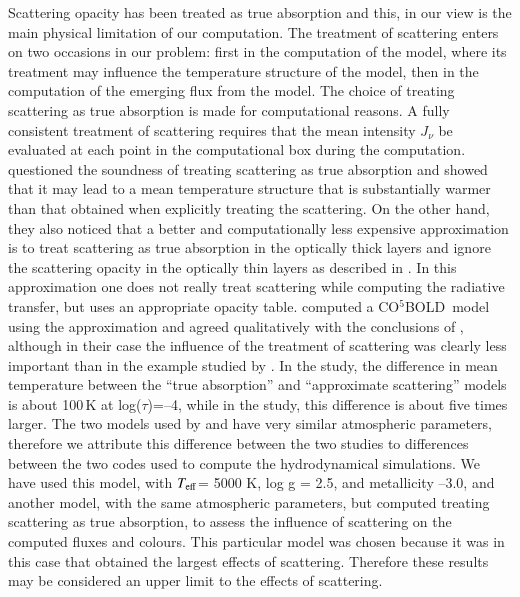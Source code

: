 \documentclass[]{aa}
\def\teff{$T\rm_{eff}$}
\newcommand{\cobold}{{\sf CO$^5$BOLD}}
\begin{document}
Scattering opacity has been treated as true absorption and this, 
in our view is the main physical  limitation of our computation.
The treatment of scattering enters on two occasions in our problem:
first in the computation of the model, where its treatment may influence
the temperature structure of the model, then in the computation of 
the emerging flux from the model.
The choice of treating scattering as true absorption is made
for computational reasons. A fully consistent treatment of scattering
requires that the mean intensity $J_\nu$  be evaluated at each point
in the computational box during the computation.
\citet{collet11} questioned the soundness of  treating
scattering as true absorption
and showed that it may lead to a mean temperature 
structure that is substantially
warmer than that obtained when explicitly treating the scattering. 
On the other hand, they also noticed that a better and computationally less
expensive approximation is to treat scattering as true absorption in the
optically thick layers and ignore the scattering opacity in the 
optically thin layers as described in \citet{Hayek}. 
In this approximation one does not really treat scattering
while computing the radiative transfer, but uses an appropriate 
opacity table.
\citet{LS12} computed a \cobold\ model using the \citet{Hayek} 
approximation
and agreed qualitatively with the conclusions of \citet{collet11},
although in their case the influence of the treatment of scattering
was clearly less important than in the example studied
by \citet{collet11}.  In the  
\citet{LS12} study, the difference in mean temperature between the ``true absorption''
and ``approximate scattering''
models is about 100\,K at log($\tau$)=--4, while in the
\citet{collet11} study, this difference is about five times larger.
The two models used by \citet{LS12} and  \citet{collet11}  
have very similar atmospheric
parameters, therefore we attribute this difference between the two studies
to differences between the two codes used to compute the hydrodynamical 
simulations. 
We have used this model, 
with \teff = 5000 K, log g = 2.5, and metallicity --3.0, and
another model, with the same atmospheric parameters, but computed
treating scattering as true absorption, to assess the influence
of scattering on the computed fluxes and colours.
This particular model was chosen because it was in this
case that \citet{collet11} obtained the largest effects of scattering.
Therefore these results may be considered an upper limit to
the effects of scattering.
\end{document}
